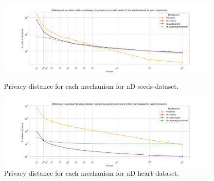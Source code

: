 %

\begin{figure}[H]
    \centering
    \begin{minipage}[c]{0.80\textwidth}
        \includegraphics[width=1\textwidth]{Results/RQ2-nd/seeds-dataset/privacy_distance_plot.png}
        \caption{Privacy distance for each mechanism for nD seeds-dataset.}
        \label{fig:privacy_seeds-dataset_comparison_nd_privacy_distance_plot}
    \end{minipage}
    \begin{minipage}[c]{0.80\textwidth}
        \includegraphics[width=1\textwidth]{Results/RQ2-nd/heart-dataset/privacy_distance_plot.png}
        \caption{Privacy distance for each mechanism for nD heart-dataset.}
        \label{fig:privacy_heart-dataset_comparison_nd_privacy_distance_plot}
    \end{minipage}
\end{figure}

\newpage
